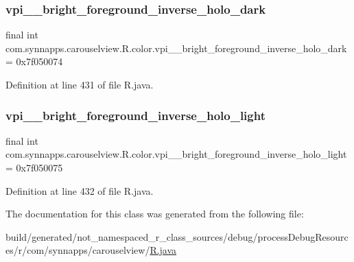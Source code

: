 \subsubsection{\texorpdfstring{vpi\_\_bright\_foreground\_inverse\_holo\_dark}{vpi\_\_bright\_foreground\_inverse\_holo\_dark}}
{\footnotesize\ttfamily final int com.\+synnapps.\+carouselview.\+R.\+color.\+vpi\+\_\+\+\_\+bright\+\_\+foreground\+\_\+inverse\+\_\+holo\+\_\+dark = 0x7f050074\hspace{0.3cm}{\ttfamily [static]}}



Definition at line 431 of file R.\+java.

\mbox{\label{classcom_1_1synnapps_1_1carouselview_1_1_r_1_1color_a94c978e237a3b2d2d1fe8c6a5e1b865d}} 
\subsubsection{\texorpdfstring{vpi\_\_bright\_foreground\_inverse\_holo\_light}{vpi\_\_bright\_foreground\_inverse\_holo\_light}}
{\footnotesize\ttfamily final int com.\+synnapps.\+carouselview.\+R.\+color.\+vpi\+\_\+\+\_\+bright\+\_\+foreground\+\_\+inverse\+\_\+holo\+\_\+light = 0x7f050075\hspace{0.3cm}{\ttfamily [static]}}



Definition at line 432 of file R.\+java.



The documentation for this class was generated from the following file\+:\begin{DoxyCompactItemize}
\item 
build/generated/not\+\_\+namespaced\+\_\+r\+\_\+class\+\_\+sources/debug/process\+Debug\+Resources/r/com/synnapps/carouselview/\mbox{\hyperlink{com_2synnapps_2carouselview_2_r_8java}{R.\+java}}\end{DoxyCompactItemize}

